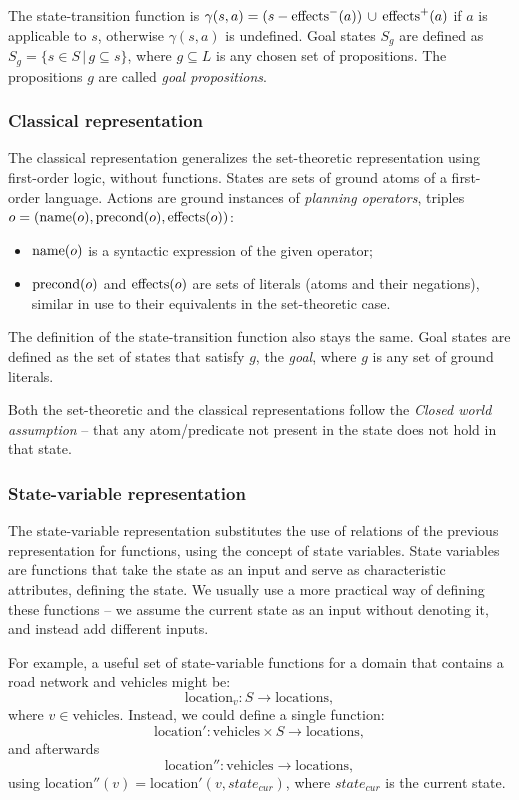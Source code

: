The state-transition function is $\gamma(s, a) = (s - \operatorname{\textrm{effects}}^-(a)) \,\cup\,
\operatorname{\textrm{effects}}^+(a)$ if $a$ is applicable to $s$,
otherwise $\gamma(s, a)$ is undefined. Goal states $S_g$ are defined as
$S_g = \{s \in S \,|\, g \subseteq s\}$, where
$g \subseteq L$ is any chosen set of propositions. The propositions $g$ are called
\textit{goal propositions}.

\subsubsection{Classical representation}

The classical representation generalizes the set-theoretic representation using first-order logic,
without functions.
States are sets of ground atoms of a first-order language.
Actions are ground instances of \textit{planning operators},
triples $o = (\operatorname{\textrm{name}}(o), \operatorname{\textrm{precond}}(o), \operatorname{\textrm{effects}}(o))$:

\begin{itemize}
\item $\operatorname{\textrm{name}}(o)$ is a syntactic expression of the given operator;
\item $\operatorname{\textrm{precond}}(o)$ and $\operatorname{\textrm{effects}}(o)$ are sets of literals
(atoms and their negations), similar in use to their equivalents
in the set-theoretic case.
\end{itemize}

The definition of the state-transition function also stays the same.
Goal states are defined as the set of states that satisfy $g$,
the \textit{goal}, where $g$ is any set of ground literals.

Both the set-theoretic and the classical representations follow the \textit{Closed world assumption} -- that any atom/predicate not present in the state does not hold in that state.

\subsubsection{State-variable representation}

The state-variable representation substitutes the use of relations of the previous
representation for functions,
using the concept of state variables. State variables are functions
that take the state as an input and serve as characteristic attributes, defining the state. We usually use a more practical way of defining these functions -- we assume
the current state as an input without denoting it, and instead add different inputs.

For example, a useful set of state-variable functions for a domain that contains a road
network and vehicles might be: $$\mathrm{location}_{v}: S \to \mathrm{locations},$$
where $v \in \mathrm{vehicles}$.
Instead, we could define a single function:
$$\mathrm{location'}: \mathrm{vehicles} \times S \to \mathrm{locations},$$
and afterwards 
$$\mathrm{location''}: \mathrm{vehicles} \to \mathrm{locations},$$
using $\mathrm{location''}(v) = \mathrm{location'}(v, state_{cur})$, where $state_{cur}$ is the current state.

